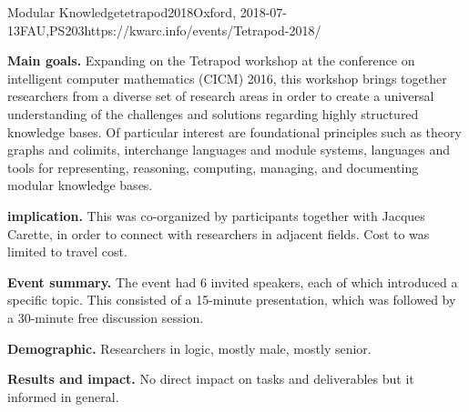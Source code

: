 \begin{event}{Modular Knowledge}{tetrapod2018}{Oxford, 2018-07-13}{FAU,PS}{20}{3}{https://kwarc.info/events/Tetrapod-2018/}

\textbf{Main goals.}
Expanding on the Tetrapod workshop at the conference on intelligent computer mathematics (CICM) 2016, this workshop brings together researchers from a diverse set of research areas in order to create a universal understanding of the challenges and solutions regarding highly structured knowledge bases.
Of particular interest are foundational principles such as theory graphs and colimits, interchange languages and module systems, languages and tools for representing, reasoning, computing, managing, and documenting modular knowledge bases.

\textbf{\ODK implication.}
This was co-organized by \ODK participants together with Jacques Carette, in order to connect with researchers in adjacent fields.
Cost to \ODK was limited to travel cost.

\textbf{Event summary.}
The event had 6 invited speakers, each of which introduced a specific topic.
This consisted of a 15-minute presentation, which was followed by a 30-minute free discussion session.

\textbf{Demographic.}
Researchers in logic, mostly male, mostly senior.

\textbf{Results and impact.}
No direct impact on \ODK tasks and deliverables but it informed  in general.


\end{event}
